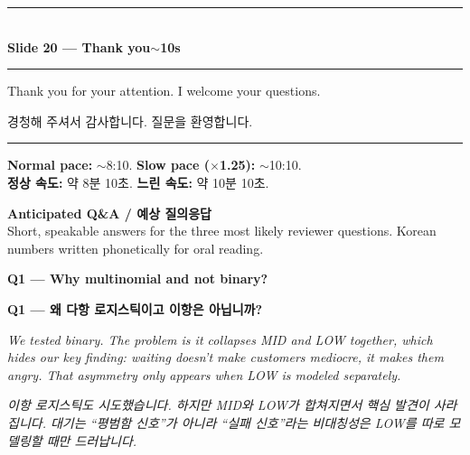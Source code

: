 \documentclass[10pt,a4paper]{article}
\newcommand{\sechead}[2]{%
  \vspace{6pt}%
  \noindent\rule{\linewidth}{0.6pt}\\[1pt]
  {\small\bfseries #1\hfill #2}\\[-3pt]
  \rule{\linewidth}{0.4pt}\par\vspace{2pt}%
}
\newcommand{\sent}[1]{#1\\[4pt]}
\newcommand{\bilingual}[2]{%
  \noindent%
  \begin{minipage}[t]{0.485\linewidth}
    \small #1
  \end{minipage}\hfill\vrule\hfill%
  \begin{minipage}[t]{0.483\linewidth}
    \small #2
  \end{minipage}\par\vspace{3pt}%
}
\begin{document}
\sechead{Slide 20 --- Thank you}{$\sim$10s}

\bilingual{%
\sent{Thank you for your attention. I welcome your questions.}
}{%
\sent{경청해 주셔서 감사합니다. 질문을 환영합니다.}
}

\vspace{10pt}

\noindent\rule{\linewidth}{0.5pt}

\vspace{4pt}

\begin{center}
\small
\textbf{Normal pace:} $\sim$8:10. \textbf{Slow pace ($\times$1.25):} $\sim$10:10.\\
\textbf{정상 속도:} 약 8분 10초. \textbf{느린 속도:} 약 10분 10초.
\end{center}

\clearpage

\begin{center}
  {\large\bfseries Anticipated Q\&A / 예상 질의응답}\\[4pt]
  {\small Short, speakable answers for the three most likely reviewer
  questions. Korean numbers written phonetically for oral reading.}
\end{center}

\vspace{8pt}

\noindent\textbf{Q1 --- Why multinomial and not binary?}

\noindent\textbf{Q1 --- 왜 다항 로지스틱이고 이항은 아닙니까?}

\vspace{3pt}

\bilingual{%
\sent{\textit{We tested binary. The problem is it collapses MID and LOW
together, which hides our key finding: waiting doesn't make customers
mediocre, it makes them angry. That asymmetry only appears when LOW is
modeled separately.}}
}{%
\sent{\textit{이항 로지스틱도 시도했습니다. 하지만 MID와 LOW가
합쳐지면서 핵심 발견이 사라집니다. 대기는 ``평범함 신호''가 아니라
``실패 신호''라는 비대칭성은 LOW를 따로 모델링할 때만 드러납니다.}}
}

\vspace{8pt}
\end{document}
